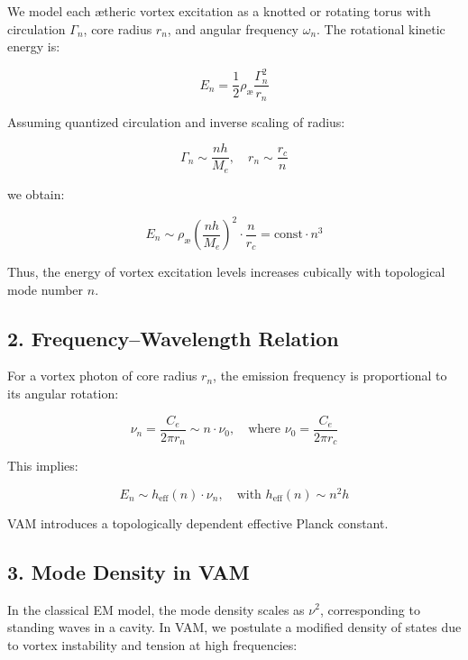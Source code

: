 \documentclass[12pt]{article}
\begin{document}
We model each ætheric vortex excitation as a knotted or rotating torus with circulation \( \Gamma_n \), core radius \( r_n \), and angular frequency \( \omega_n \). The rotational kinetic energy is:

\begin{equation}
E_n = \frac{1}{2} \rho_\text{\ae} \frac{\Gamma_n^2}{r_n}
\end{equation}

Assuming quantized circulation and inverse scaling of radius:

\begin{equation}
\Gamma_n \sim \frac{n h}{M_e}, \quad r_n \sim \frac{r_c}{n}
\end{equation}

we obtain:

\begin{equation}
E_n \sim \rho_\text{\ae} \left( \frac{n h}{M_e} \right)^2 \cdot \frac{n}{r_c}
= \text{const} \cdot n^3
\end{equation}

Thus, the energy of vortex excitation levels increases cubically with topological mode number \( n \).

\subsection*{2. Frequency–Wavelength Relation}

For a vortex photon of core radius \( r_n \), the emission frequency is proportional to its angular rotation:

\begin{equation}
\nu_n = \frac{C_e}{2\pi r_n} \sim n \cdot \nu_0, \quad \text{where } \nu_0 = \frac{C_e}{2\pi r_c}
\end{equation}

This implies:

\begin{equation}
E_n \sim h_\text{eff}(n) \cdot \nu_n, \quad \text{with } h_\text{eff}(n) \sim n^2 h
\end{equation}

VAM introduces a topologically dependent effective Planck constant.

\subsection*{3. Mode Density in VAM}

In the classical EM model, the mode density scales as \( \nu^2 \), corresponding to standing waves in a cavity. In VAM, we postulate a modified density of states due to vortex instability and tension at high frequencies:
\end{document}

